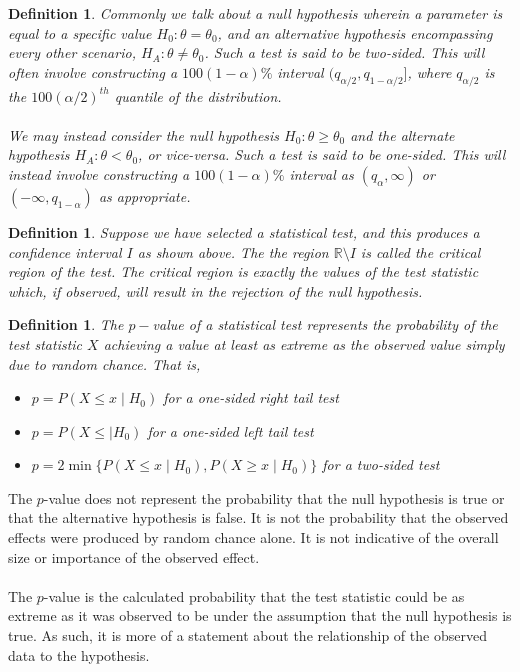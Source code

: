 \documentclass[1pt]{report}
\newtheorem{defn}[thm]{Definition}
\newcommand{\Rone}{\mathbb{R}}
\newcommand{\R}{\Rone}
\newcommand{\<}{\langle}
\renewcommand{\>}{\rangle}
\begin{document}
\begin{defn}\label{def:onesidedtwosided}
Commonly we talk about a null hypothesis wherein a parameter is equal to a specific value $H_0: \theta = \theta_0$, and an alternative hypothesis encompassing every other scenario, $H_A: \theta \neq \theta_0$. Such a test is said to be \emph{two-sided}. This will often involve constructing a $100(1-\alpha)\%$ interval $(q_{\alpha/2},q_{1-\alpha/2}]$, where $q_{\alpha/2}$ is the $100(\alpha/2)^{th}$ quantile of the distribution.\\
\\
We may instead consider the null hypothesis $H_0:\theta \geq \theta_0$ and the alternate hypothesis $H_A: \theta < \theta_0$, or vice-versa. Such a test is said to be \emph{one-sided}. This will instead involve constructing a $100(1-\alpha)\%$ interval as $(q_\alpha, \infty)$ or $(-\infty, q_{1-\alpha})$ as appropriate.
\end{defn}
\begin{defn}\label{def:criticalregion}
Suppose we have selected a statistical test, and this produces a confidence interval $I$ as shown above. The the region $\R \setminus I$ is called the \emph{critical region} of the test. The critical region is exactly the values of the test statistic which, if observed, will result in the rejection of the null hypothesis.
\end{defn}
\begin{defn}\label{def:pvalue}
The $p-$\emph{value} of a statistical test represents the probability of the test statistic $X$ achieving a value at least as extreme as the observed value simply due to random chance. That is, \newpage
\begin{itemize}
\item $p=P(X \leq x \mid H_0)$ for a one-sided right tail test
\item $p=P(X \leq \mid H_0)$ for a one-sided left tail test
\item $p=2\min\{P(X \leq x \mid H_0), P(X\geq x \mid H_0)\}$ for a two-sided test
\end{itemize}
\end{defn}
\begin{rmkbox}
The $p$-value does not represent the probability that the null hypothesis is true or that the alternative hypothesis is false. It is not the probability that the observed effects were produced by random chance alone. It is not indicative of the overall size or importance of the observed effect.\\
\\
The $p$-value is the calculated probability that the test statistic could be as extreme as it was observed to be under the assumption that the null hypothesis is true. As such, it is more of a statement about the relationship of the observed data to the hypothesis.
\end{rmkbox}
\newpage
\end{document}
